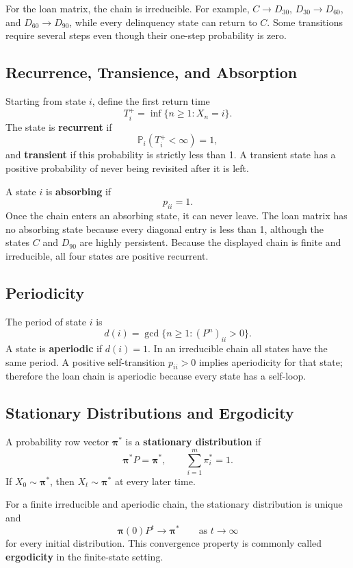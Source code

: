 \documentclass[12pt,openany]{book}
\theoremstyle{definition}
\theoremstyle{remark}
\begin{document}
For the loan matrix, the chain is irreducible. For example, \(C\to D_{30}\),
\(D_{30}\to D_{60}\), and \(D_{60}\to D_{90}\), while every delinquency
state can return to \(C\). Some transitions require several steps even though
their one-step probability is zero.

\subsection{Recurrence, Transience, and Absorption}

Starting from state \(i\), define the first return time
\[
T_i^+=\inf\{n\geq1:X_n=i\}.
\]
The state is \textbf{recurrent} if
\[
\mathbb{P}_i(T_i^+<\infty)=1,
\]
and \textbf{transient} if this probability is strictly less than 1. A
transient state has a positive probability of never being revisited after it
is left.

A state \(i\) is \textbf{absorbing} if
\[
p_{ii}=1.
\]
Once the chain enters an absorbing state, it can never leave. The loan matrix
has no absorbing state because every diagonal entry is less than 1, although
the states \(C\) and \(D_{90}\) are highly persistent. Because the displayed
chain is finite and irreducible, all four states are positive recurrent.

\subsection{Periodicity}

The period of state \(i\) is
\[
d(i)=\gcd\{n\geq1:(P^n)_{ii}>0\}.
\]
A state is \textbf{aperiodic} if \(d(i)=1\). In an irreducible chain all
states have the same period. A positive self-transition \(p_{ii}>0\) implies
aperiodicity for that state; therefore the loan chain is aperiodic because
every state has a self-loop.

\subsection{Stationary Distributions and Ergodicity}

A probability row vector \(\boldsymbol{\pi}^{*}\) is a
\textbf{stationary distribution} if
\[
\boxed{
\boldsymbol{\pi}^{*}P=\boldsymbol{\pi}^{*},
\qquad
\sum_{i=1}^{m}\pi_i^{*}=1
}.
\]
If \(X_0\sim\boldsymbol{\pi}^{*}\), then
\(X_t\sim\boldsymbol{\pi}^{*}\) at every later time.

For a finite irreducible and aperiodic chain, the stationary distribution is
unique and
\[
\boldsymbol{\pi}(0)P^t
\longrightarrow
\boldsymbol{\pi}^{*}
\qquad\text{as }t\to\infty
\]
for every initial distribution. This convergence property is commonly
called \textbf{ergodicity} in the finite-state setting.
\end{document}
